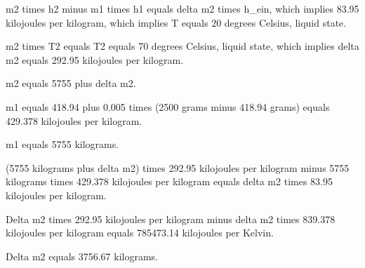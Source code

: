 m2 times h2 minus m1 times h1 equals delta m2 times h_ein, which implies 83.95 kilojoules per kilogram, which implies T equals 20 degrees Celsius, liquid state.

m2 times T2 equals T2 equals 70 degrees Celsius, liquid state, which implies delta m2 equals 292.95 kilojoules per kilogram.

m2 equals 5755 plus delta m2.

m1 equals 418.94 plus 0.005 times (2500 grams minus 418.94 grams) equals 429.378 kilojoules per kilogram.

m1 equals 5755 kilograms.

(5755 kilograms plus delta m2) times 292.95 kilojoules per kilogram minus 5755 kilograms times 429.378 kilojoules per kilogram equals delta m2 times 83.95 kilojoules per kilogram.

Delta m2 times 292.95 kilojoules per kilogram minus delta m2 times 839.378 kilojoules per kilogram equals 785473.14 kilojoules per Kelvin.

Delta m2 equals 3756.67 kilograms.